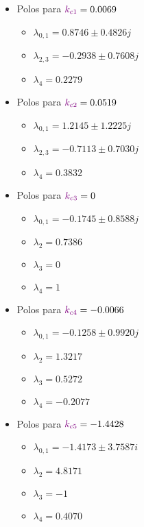 \begin{multicols}{2}
  \begin{itemize}
  \item Polos para \(\mathbin{\color{violet}k_{c1}} = 0.0069  \) 
    \begin{itemize}
      \item $\lambda_{0,1} = 0.8746 \pm 0.4826j$
      \item $\lambda_{2,3} = -0.2938 \pm 0.7608j$
      \item $\lambda_{4} = 0.2279$
    \end{itemize}

  \item Polos para \(\mathbin{\color{violet}k_{c2}} = 0.0519\)
    \begin{itemize}
      \item $\lambda_{0,1} = 1.2145 \pm 1.2225j$
      \item $\lambda_{2,3} = -0.7113 \pm 0.7030j$
      \item $\lambda_{4} = 0.3832$
    \end{itemize}

  \item Polos para \(\mathbin{\color{violet}k_{c3}} = 0\)
    \begin{itemize}
      \item $\lambda_{0,1} = -0.1745 \pm 0.8588j$
      \item $\lambda_{2} = 0.7386$
      \item $\lambda_{3} = 0$
      \item $\lambda_{4} = 1$
    \end{itemize}

    \columnbreak

  \item Polos para \(\mathbin{\color{violet}k_{c4}} = -0.0066\)
    \begin{itemize}
      \item $\lambda_{0,1} = -0.1258 \pm 0.9920j$
      \item $\lambda_{2} = 1.3217$
      \item $\lambda_{3} = 0.5272$
      \item $\lambda_{4} = -0.2077$
    \end{itemize}

  \item Polos para \(\mathbin{\color{violet}k_{c5}} = -1.4428\)
    \begin{itemize}
      \item $\lambda_{0,1} = -1.4173 \pm 3.7587i$
      \item $\lambda_{2} = 4.8171$
      \item $\lambda_{3} = -1$
      \item $\lambda_{4} = 0.4070$
    \end{itemize}
  \end{itemize}
\end{multicols}

